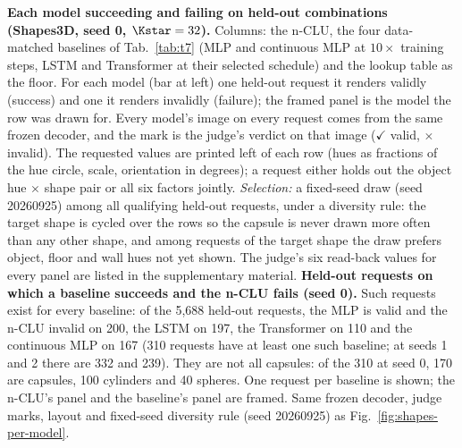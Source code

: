 \textbf{Each model succeeding and failing on held-out combinations (Shapes3D, seed 0, $\Kstar=32$).} Columns: the n-CLU, the four data-matched baselines of Tab.~\ref{tab:t7} (MLP and continuous MLP at $10\times$ training steps, LSTM and Transformer at their selected schedule) and the lookup table as the floor. For each model (bar at left) one held-out request it renders validly (success) and one it renders invalidly (failure); the framed panel is the model the row was drawn for. Every model's image on every request comes from the same frozen decoder, and the mark is the judge's verdict on that image ($\checkmark$ valid, $\times$ invalid). The requested values are printed left of each row (hues as fractions of the hue circle, scale, orientation in degrees); a request either holds out the object hue $\times$ shape pair or all six factors jointly. \emph{Selection:} a fixed-seed draw (seed 20260925) among all qualifying held-out requests, under a diversity rule: the target shape is cycled over the rows so the capsule is never drawn more often than any other shape, and among requests of the target shape the draw prefers object, floor and wall hues not yet shown. The judge's six read-back values for every panel are listed in the supplementary material.
\textbf{Held-out requests on which a baseline succeeds and the n-CLU fails (seed 0).} Such requests exist for every baseline: of the 5,688 held-out requests, the MLP is valid and the n-CLU invalid on 200, the LSTM on 197, the Transformer on 110 and the continuous MLP on 167 (310 requests have at least one such baseline; at seeds 1 and 2 there are 332 and 239). They are not all capsules: of the 310 at seed 0, 170 are capsules, 100 cylinders and 40 spheres. One request per baseline is shown; the n-CLU's panel and the baseline's panel are framed. Same frozen decoder, judge marks, layout and fixed-seed diversity rule (seed 20260925) as Fig.~\ref{fig:shapes-per-model}.
